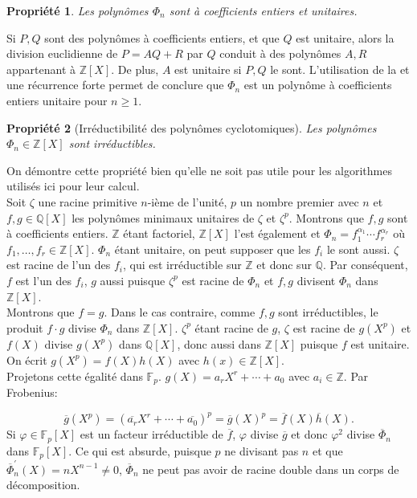 \documentclass{article}
\theoremstyle{break}                  %
\newtheorem{propriete}{Propriété}
\begin{document}
\begin{propriete}
	Les polynômes $\Phi_n$ sont à coefficients entiers et unitaires.
\end{propriete}
Si $P, Q$ sont des polynômes à coefficients entiers, et que $Q$ est unitaire, alors la division euclidienne de $P = AQ + R$ par $Q$ conduit à des polynômes $A,R$ appartenant à $\mathbb Z[X]$. De plus, $A$ est unitaire si $P, Q$ le sont.  L'utilisation de la  et une récurrence forte permet de conclure que $\Phi_n$ est un polynôme à coefficients entiers unitaire pour $n \ge 1$.

\begin{propriete}[Irréductibilité des polynômes cyclotomiques]
	Les polynômes $\Phi_n \in \mathbb Z[X]$ sont irréductibles.
\end{propriete}
On démontre cette propriété bien qu'elle ne soit pas utile pour les algorithmes utilisés ici pour leur calcul.\\

Soit $\zeta$ une racine primitive $n$-ième de l'unité, $p$ un nombre premier avec $n$ et $f,g \in \mathbb Q[X]$ les polynômes minimaux unitaires de $\zeta$ et $\zeta^p$. Montrons que $f,g$ sont à coefficients entiers. $\mathbb Z$ étant factoriel, $\mathbb Z[X]$ l'est également et $\Phi_n = f_1^{\alpha_1} \cdots f_r^{\alpha_r}$ où $f_1, \dots ,f_r \in \mathbb Z[X]$. $\Phi_n$ étant unitaire, on peut supposer que les $f_i$ le sont aussi. $\zeta$ est racine de l'un des $f_i$, qui est irréductible sur $\mathbb Z$ et donc sur $\mathbb Q$. Par conséquent, $f$ est l'un des $f_i$, $g$ aussi puisque $\zeta^p$ est racine de $\Phi_n$ et $f,g$ divisent $\Phi_n$ dans $\mathbb Z[X]$.\\

Montrons que $f=g$. Dans le cas contraire, comme $f,g$ sont irréductibles, le produit $f \cdot g$ divise $\Phi_n$ dans $\mathbb Z[X]$. $\zeta^p$ étant racine de $g$, $\zeta$ est racine de $g(X^p)$ et $f(X)$ divise $g(X^p)$ dans $\mathbb Q[X]$, donc aussi dans $\mathbb Z[X]$ puisque $f$ est unitaire. On écrit $g(X^p) = f(X)h(X)$ avec $h(x) \in \mathbb Z[X]$.\\

Projetons cette égalité dans $\mathbb F_p$. $g(X) = a_r X^r + \cdots + a_0$ avec $a_i \in \mathbb Z$. Par Frobenius:

$$\overline{g}(X^p) = (\overline{a_r} X^r + \cdots + \overline{a_0})^p = \overline{g}(X)^p = \overline{f}(X) \overline{h}(X).$$ Si $\varphi \in \mathbb F_p[X]$ est un facteur irréductible de $\overline{f}$, $\varphi$ divise $\overline{g}$ et donc $\varphi^2$ divise $\overline{\Phi}_n$ dans $\mathbb F_p[X]$. Ce qui est absurde, puisque $p$ ne divisant pas $n$ et que $\overline{\Phi}_n^\prime(X) = n X^{n-1} \neq 0$, $\overline{\Phi}_n$ ne peut pas avoir de racine double dans un corps de décomposition.\\
\end{document}
